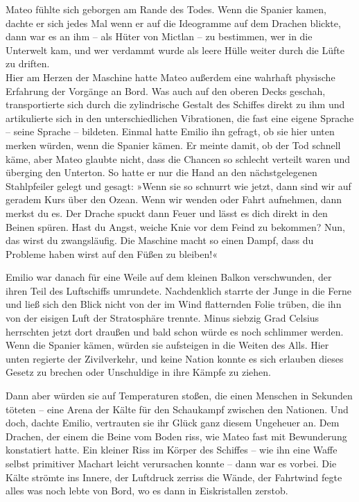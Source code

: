 Mateo fühlte sich geborgen am Rande des Todes. Wenn die Spanier
kamen, dachte er sich jedes Mal wenn er auf die Ideogramme auf dem
Drachen blickte, dann war es an ihm – als Hüter von Mictlan – zu
bestimmen, wer in die Unterwelt kam, und wer verdammt wurde als
leere Hülle weiter durch die Lüfte zu driften.\\ Hier am Herzen der
Maschine hatte Mateo außerdem eine wahrhaft physische Erfahrung der
Vorgänge an Bord. Was auch auf den oberen Decks geschah,
transportierte sich durch die zylindrische Gestalt des Schiffes
direkt zu ihm und artikulierte sich in den unterschiedlichen
Vibrationen, die fast eine eigene Sprache – seine Sprache –
bildeten. Einmal hatte Emilio ihn gefragt, ob sie hier unten merken
würden, wenn die Spanier kämen. Er meinte damit, ob der Tod schnell
käme, aber Mateo glaubte nicht, dass die Chancen so schlecht
verteilt waren und überging den Unterton. So hatte er nur die Hand
an den nächstgelegenen Stahlpfeiler gelegt und gesagt: »Wenn sie so
schnurrt wie jetzt, dann sind wir auf geradem Kurs über den Ozean.
Wenn wir wenden oder Fahrt aufnehmen, dann merkst du es. Der Drache
spuckt dann Feuer und lässt es dich direkt in den Beinen spüren.
Hast du Angst, weiche Knie vor dem Feind zu bekommen? Nun, das
wirst du zwangsläufig. Die Maschine macht so einen Dampf, dass du
Probleme haben wirst auf den Füßen zu bleiben!«

\bigpar

Emilio war danach für eine Weile auf dem kleinen Balkon
verschwunden, der ihren Teil des Luftschiffs umrundete.
Nachdenklich starrte der Junge in die Ferne und ließ sich den Blick
nicht von der im Wind flatternden Folie trüben, die ihn von der
eisigen Luft der Stratosphäre trennte. Minus siebzig Grad Celsius
herrschten jetzt dort draußen und bald schon würde es noch
schlimmer werden. Wenn die Spanier kämen, würden sie aufsteigen in
die Weiten des Alls. Hier unten regierte der Zivilverkehr, und
keine Nation konnte es sich erlauben dieses Gesetz zu brechen oder
Unschuldige in ihre Kämpfe zu ziehen.

Dann aber würden sie auf Temperaturen stoßen, die einen Menschen in
Sekunden töteten – eine Arena der Kälte für den Schaukampf zwischen
den Nationen. Und doch, dachte Emilio, vertrauten sie ihr Glück
ganz diesem Ungeheuer an. Dem Drachen, der einem die Beine vom
Boden riss, wie Mateo fast mit Bewunderung konstatiert hatte. Ein
kleiner Riss im Körper des Schiffes – wie ihn eine Waffe selbst
primitiver Machart leicht verursachen konnte – dann war es vorbei.
Die Kälte strömte ins Innere, der Luftdruck zerriss die Wände, der
Fahrtwind fegte alles was noch lebte von Bord, wo es dann in
Eiskristallen zerstob.

